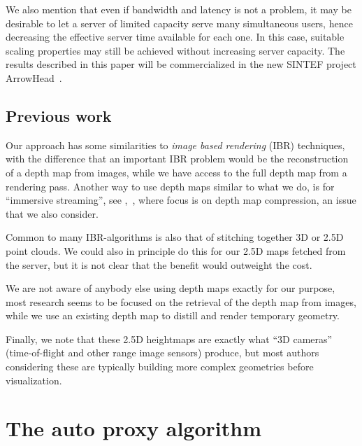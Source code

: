 We also mention that even if bandwidth and latency is not a problem, it may be
desirable to let a server of limited capacity serve many simultaneous users,
hence decreasing the effective server time available for each one. In this case,
suitable scaling properties may still be achieved without increasing server
capacity. The results described in this paper will be commercialized in the new
SINTEF project \mbox{ArrowHead}~\cite{arrowhead}.

\subsection{Previous work}
\label{sec:prevWork}

Our approach has some similarities to {\em image based rendering} (IBR)
techniques, with the difference that an important IBR problem would be the
reconstruction of a depth map from images, while we have access to the full
depth map from a rendering pass.  Another way to use depth maps similar to what
we do, is for ``immersive streaming'', see \eg,~\cite{ibr}, where focus is on
depth map compression, an issue that we also consider.

Common to many IBR-algorithms is also that of stitching together 3D or 2.5D
point clouds. We could also in principle do this for our 2.5D maps fetched from
the server, but it is not clear that the benefit would outweight the
cost. 

We are not aware of anybody else using depth maps exactly for our purpose, most
research seems to be focused on the retrieval of the depth map from images,
while we use an existing depth map to distill and render temporary geometry.

Finally, we note that these 2.5D heightmaps are exactly what ``3D cameras''
(time-of-flight and other range image sensors) produce, but most authors
considering these are typically building more complex geometries before
visualization. %



\section{The auto proxy algorithm}

